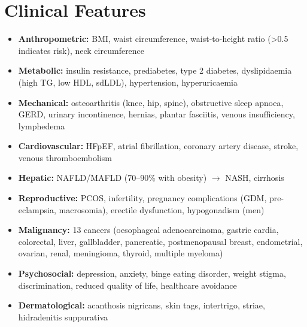 \section*{Clinical Features}
\begin{itemize}
    \item \textbf{Anthropometric:} BMI, waist circumference, waist-to-height ratio (>0.5 indicates risk), neck circumference
    \item \textbf{Metabolic:} insulin resistance, prediabetes, type 2 diabetes, dyslipidaemia (high TG, low HDL, sdLDL), hypertension, hyperuricaemia
    \item \textbf{Mechanical:} osteoarthritis (knee, hip, spine), obstructive sleep apnoea, GERD, urinary incontinence, hernias, plantar fasciitis, venous insufficiency, lymphedema
    \item \textbf{Cardiovascular:} HFpEF, atrial fibrillation, coronary artery disease, stroke, venous thromboembolism
    \item \textbf{Hepatic:} NAFLD/MAFLD (70--90\% with obesity) $\to$ NASH, cirrhosis
    \item \textbf{Reproductive:} PCOS, infertility, pregnancy complications (GDM, pre-eclampsia, macrosomia), erectile dysfunction, hypogonadism (men)
    \item \textbf{Malignancy:} 13 cancers (oesophageal adenocarcinoma, gastric cardia, colorectal, liver, gallbladder, pancreatic, postmenopausal breast, endometrial, ovarian, renal, meningioma, thyroid, multiple myeloma)
    \item \textbf{Psychosocial:} depression, anxiety, binge eating disorder, weight stigma, discrimination, reduced quality of life, healthcare avoidance
    \item \textbf{Dermatological:} acanthosis nigricans, skin tags, intertrigo, striae, hidradenitis suppurativa
\end{itemize}

